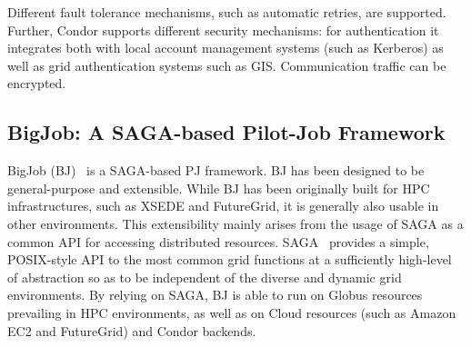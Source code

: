 \documentclass[conference,final]{IEEEtran}
\newcommand{\terminology}[1]{ {\textcolor{red} {(Terminology used: \textbf{#1}) }}}
\newcommand{\jhanote}[1]{ {\textcolor{red} { ***shantenu: #1 }}}
\newcommand{\alnote}[1]{ {\textcolor{blue} { ***andreL: #1 }}}
\newcommand{\terminology}[1]{}
\newcommand{\alnote}[1]{}
\newcommand{\jhanote}[1]{}
\newcommand{\upp}{\vspace*{-0.5em}}
\begin{document}
Different fault tolerance mechanisms, such as automatic retries, are
supported.  Further, Condor supports different security mechanisms:
for authentication it integrates both with local account management
systems (such as Kerberos) as well as grid authentication systems such
as GIS. Communication traffic can be encrypted.


\subsection{BigJob: A SAGA-based Pilot-Job Framework\upp\upp}
\label{sec:bigjob_description}










BigJob (BJ)~\cite{bigjob_web,saga_bigjob_condor_cloud} is a SAGA-based PJ
framework. BJ has been designed to be general-purpose and extensible. While BJ
has been originally built for HPC infrastructures, such as XSEDE and FutureGrid,
it is generally also usable in other environments. This extensibility mainly
arises from the usage of SAGA as a common API for accessing distributed
resources. SAGA~\cite{saga_url,ogf-gfd-90} provides a simple, POSIX-style API to
the most common grid functions at a sufficiently high-level of abstraction so as
to be independent of the diverse and dynamic grid environments.
By relying on SAGA, BJ is able to run on Globus resources prevailing in HPC
environments, as well as on Cloud resources (such as Amazon EC2 and FutureGrid)
and Condor backends.
\end{document}

